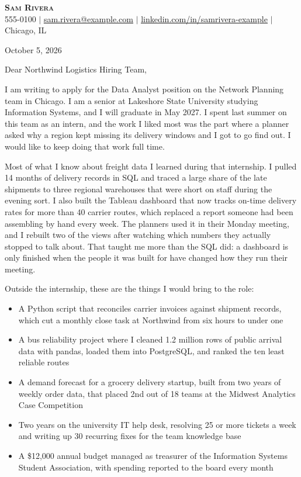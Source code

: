 \documentclass[letterpaper,11pt]{article}
\begin{document}
\raggedright
\setlength{\parskip}{11pt}

\begin{center}
    \textbf{\Huge \scshape Sam Rivera} \\ \vspace{1pt}
    \small 555-0100 $|$ \href{mailto:sam.rivera@example.com}{\underline{sam.rivera@example.com}} $|$
    \href{https://linkedin.com/in/samrivera-example}{\underline{linkedin.com/in/samrivera-example}} $|$ Chicago, IL
\end{center}
\vspace{2pt}

October 5, 2026

Dear Northwind Logistics Hiring Team,

I am writing to apply for the Data Analyst position on the Network Planning team in Chicago. I am a senior at Lakeshore State University studying Information Systems, and I will graduate in May 2027. I spent last summer on this team as an intern, and the work I liked most was the part where a planner asked why a region kept missing its delivery windows and I got to go find out. I would like to keep doing that work full time.

Most of what I know about freight data I learned during that internship. I pulled 14 months of delivery records in SQL and traced a large share of the late shipments to three regional warehouses that were short on staff during the evening sort. I also built the Tableau dashboard that now tracks on-time delivery rates for more than 40 carrier routes, which replaced a report someone had been assembling by hand every week. The planners used it in their Monday meeting, and I rebuilt two of the views after watching which numbers they actually stopped to talk about. That taught me more than the SQL did: a dashboard is only finished when the people it was built for have changed how they run their meeting.

Outside the internship, these are the things I would bring to the role:
\begin{itemize}[leftmargin=0.5in, labelsep=0.18in, itemsep=0pt, parsep=0pt, topsep=0pt, partopsep=0pt]
  \item A Python script that reconciles carrier invoices against shipment records, which cut a monthly close task at Northwind from six hours to under one
  \item A bus reliability project where I cleaned 1.2 million rows of public arrival data with pandas, loaded them into PostgreSQL, and ranked the ten least reliable routes
  \item A demand forecast for a grocery delivery startup, built from two years of weekly order data, that placed 2nd out of 18 teams at the Midwest Analytics Case Competition
  \item Two years on the university IT help desk, resolving 25 or more tickets a week and writing up 30 recurring fixes for the team knowledge base
  \item A \$12,000 annual budget managed as treasurer of the Information Systems Student Association, with spending reported to the board every month
\end{itemize}
\end{document}
